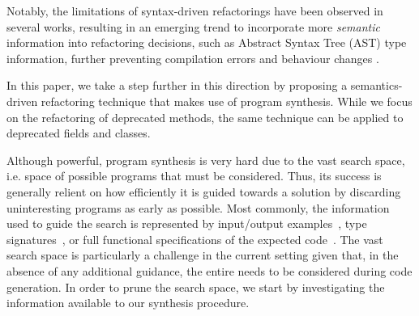 \documentclass[sigconf,review,anonymous]{acmart}
\begin{document}
%
%
Notably, the limitations of syntax-driven refactorings have been observed
in several works, resulting in an emerging trend to incorporate more {\em semantic}
information into refactoring decisions, such as Abstract Syntax Tree (AST) 
type information,
further preventing compilation errors and behaviour changes
\cite{Steimann2011,Steimann2012Pilgrim,Steimann2011KollePilgrim}.

In this paper, we take a step further in this direction by proposing a
semantics-driven refactoring technique that makes use of program synthesis.
While we focus on the refactoring of deprecated methods, the same
technique can be applied to deprecated fields and classes.


Although powerful, program synthesis is very hard due to the vast search space, i.e. space of possible programs that must be considered. Thus, its success is generally relient on how efficiently it is guided towards a solution by discarding uninteresting programs as early as possible. Most commonly, the information used to guide the search is represented by input/output examples~\cite{DBLP:conf/pldi/FeserCD15}, type signatures~\cite{DBLP:conf/pldi/OseraZ15}, or full functional specifications of the expected code~\cite{DBLP:conf/ijcai/MannaW79}.
%
The vast search space is particularly a challenge in the current setting given that, in the absence of any additional guidance, the entire  needs to be considered during code generation.
In order to prune the search space, we start by investigating the information available to our synthesis procedure.
\end{document}
